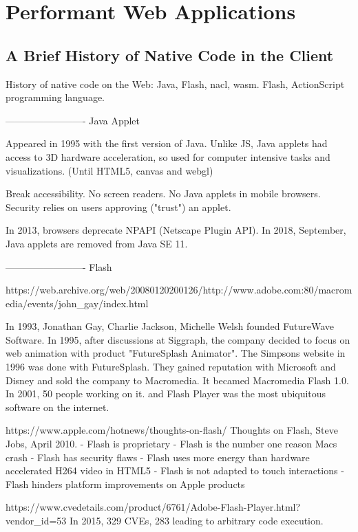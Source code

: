 \chapter{Performant Web Applications}%
\label{cha:performant_web_applications}

\minitoc%

\section{A Brief History of Native Code in the Client}%
\label{sec:native_client}

History of native code on the Web: Java, Flash, nacl, wasm.
Flash, ActionScript programming language.

------------------------- Java Applet

Appeared in 1995 with the first version of Java.
Unlike JS, Java applets had access to 3D hardware acceleration,
so used for computer intensive tasks and visualizations.
(Until HTML5, canvas and webgl)

Break accessibility. No screen readers.
No Java applets in mobile browsers.
Security relies on users approving ("trust") an applet.


In 2013, browsers deprecate NPAPI (Netscape Plugin API).
In 2018, September, Java applets are removed from Java SE 11.


------------------------- Flash

https://web.archive.org/web/20080120200126/http://www.adobe.com:80/macromedia/events/john_gay/index.html

In 1993, Jonathan Gay, Charlie Jackson, Michelle Welsh founded FutureWave Software.
In 1995, after discussions at Siggraph,
the company decided to focus on web animation with product "FutureSplash Animator".
The Simpsons website in 1996 was done with FutureSplash.
They gained reputation with Microsoft and Disney and sold the company to Macromedia.
It becamed Macromedia Flash 1.0.
In 2001, 50 people working on it. and Flash Player was the most ubiquitous software on the internet.

https://www.apple.com/hotnews/thoughts-on-flash/
Thoughts on Flash, Steve Jobs, April 2010.
 - Flash is proprietary
 - Flash is the number one reason Macs crash
 - Flash has security flaws
 - Flash uses more energy than hardware accelerated H264 video in HTML5
 - Flash is not adapted to touch interactions
 - Flash hinders platform improvements on Apple products

https://www.cvedetails.com/product/6761/Adobe-Flash-Player.html?vendor_id=53
In 2015, 329 CVEs, 283 leading to arbitrary code execution.

